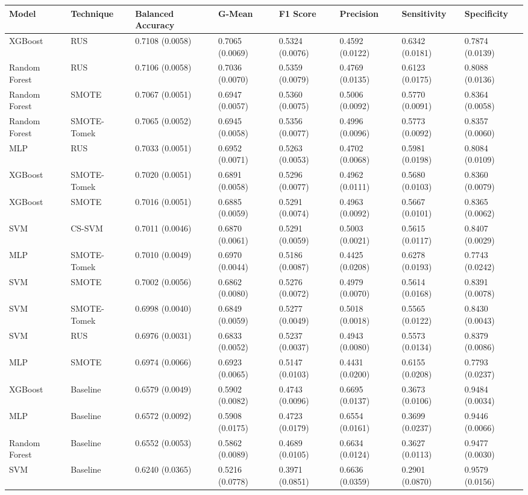 \begin{tabular}{llllllll}
\toprule
Model & Technique & Balanced Accuracy & G-Mean & F1 Score & Precision & Sensitivity & Specificity \\
\midrule
XGBoost & RUS & 0.7108 (0.0058) & 0.7065 (0.0069) & 0.5324 (0.0076) & 0.4592 (0.0122) & 0.6342 (0.0181) & 0.7874 (0.0139) \\
Random Forest & RUS & 0.7106 (0.0058) & 0.7036 (0.0070) & 0.5359 (0.0079) & 0.4769 (0.0135) & 0.6123 (0.0175) & 0.8088 (0.0136) \\
Random Forest & SMOTE & 0.7067 (0.0051) & 0.6947 (0.0057) & 0.5360 (0.0075) & 0.5006 (0.0092) & 0.5770 (0.0091) & 0.8364 (0.0058) \\
Random Forest & SMOTE-Tomek & 0.7065 (0.0052) & 0.6945 (0.0058) & 0.5356 (0.0077) & 0.4996 (0.0096) & 0.5773 (0.0092) & 0.8357 (0.0060) \\
MLP & RUS & 0.7033 (0.0051) & 0.6952 (0.0071) & 0.5263 (0.0053) & 0.4702 (0.0068) & 0.5981 (0.0198) & 0.8084 (0.0109) \\
XGBoost & SMOTE-Tomek & 0.7020 (0.0051) & 0.6891 (0.0058) & 0.5296 (0.0077) & 0.4962 (0.0111) & 0.5680 (0.0103) & 0.8360 (0.0079) \\
XGBoost & SMOTE & 0.7016 (0.0051) & 0.6885 (0.0059) & 0.5291 (0.0074) & 0.4963 (0.0092) & 0.5667 (0.0101) & 0.8365 (0.0062) \\
SVM & CS-SVM & 0.7011 (0.0046) & 0.6870 (0.0061) & 0.5291 (0.0059) & 0.5003 (0.0021) & 0.5615 (0.0117) & 0.8407 (0.0029) \\
MLP & SMOTE-Tomek & 0.7010 (0.0049) & 0.6970 (0.0044) & 0.5186 (0.0087) & 0.4425 (0.0208) & 0.6278 (0.0193) & 0.7743 (0.0242) \\
SVM & SMOTE & 0.7002 (0.0056) & 0.6862 (0.0080) & 0.5276 (0.0072) & 0.4979 (0.0070) & 0.5614 (0.0168) & 0.8391 (0.0078) \\
SVM & SMOTE-Tomek & 0.6998 (0.0040) & 0.6849 (0.0059) & 0.5277 (0.0049) & 0.5018 (0.0018) & 0.5565 (0.0122) & 0.8430 (0.0043) \\
SVM & RUS & 0.6976 (0.0031) & 0.6833 (0.0052) & 0.5237 (0.0037) & 0.4943 (0.0080) & 0.5573 (0.0134) & 0.8379 (0.0086) \\
MLP & SMOTE & 0.6974 (0.0066) & 0.6923 (0.0065) & 0.5147 (0.0103) & 0.4431 (0.0200) & 0.6155 (0.0208) & 0.7793 (0.0237) \\
XGBoost & Baseline & 0.6579 (0.0049) & 0.5902 (0.0082) & 0.4743 (0.0096) & 0.6695 (0.0137) & 0.3673 (0.0106) & 0.9484 (0.0034) \\
MLP & Baseline & 0.6572 (0.0092) & 0.5908 (0.0175) & 0.4723 (0.0179) & 0.6554 (0.0161) & 0.3699 (0.0237) & 0.9446 (0.0066) \\
Random Forest & Baseline & 0.6552 (0.0053) & 0.5862 (0.0089) & 0.4689 (0.0105) & 0.6634 (0.0124) & 0.3627 (0.0113) & 0.9477 (0.0030) \\
SVM & Baseline & 0.6240 (0.0365) & 0.5216 (0.0778) & 0.3971 (0.0851) & 0.6636 (0.0359) & 0.2901 (0.0870) & 0.9579 (0.0156) \\
\bottomrule
\end{tabular}
